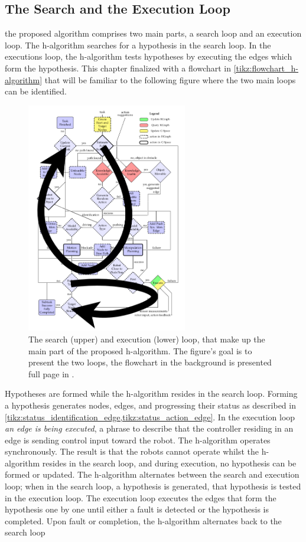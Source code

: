 \subsection{The Search and the Execution Loop}
the proposed algorithm comprises two main parts, a search loop and an execution loop. The \ac{h-algorithm} searches for a hypothesis in the search loop. In the executions loop, the \ac{h-algorithm} tests hypotheses by executing the edges which form the hypothesis. This chapter finalized with a flowchart in \cref{tikz:flowchart_h-algorithm} that will be familiar to the following figure where the two main loops can be identified.\bs

\begin{figure}[h]
    \centering
    \includegraphics[width=7cm]{figures/proposed_method/two_loops_identified}
  \caption{The search (upper) and execution (lower) loop, that make up the main part of the proposed \ac{h-algorithm}. The figure's goal is to present the two loops, the flowchart in the background is presented full page in .}%
    \label{fig:two_loops_identified}
\end{figure}

Hypotheses are formed while the \ac{h-algorithm} resides in the search loop. Forming a hypothesis generates nodes, edges, and progressing their status as described in \cref{tikz:status_identification_edge,tikz:status_action_edge}. In the execution loop \textit{an edge is being executed}, a phrase to describe that the controller residing in an edge is sending control input toward the robot. The \ac{h-algorithm} operates synchronously. The result is that the robots cannot operate whilst the \ac{h-algorithm} resides in the search loop, and during execution, no hypothesis can be formed or updated. The \ac{h-algorithm} alternates between the search and execution loop; when in the search loop, a hypothesis is generated, that hypothesis is tested in the execution loop. The execution loop executes the edges that form the hypothesis one by one until either a fault is detected or the hypothesis is completed. Upon fault or completion, the \ac{h-algorithm} alternates back to the search loop\bs

